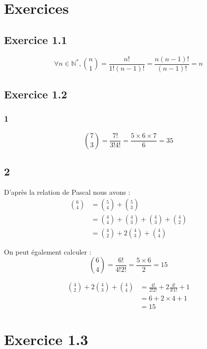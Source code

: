 \documentclass{report}
\begin{document}
\section*{Exercices}

\subsection*{Exercice 1.1}

\[ \forall n \in \mathbb{N}^*, \binom{n}{1} =\frac{n!}{1!(n-1)!} = \frac{n(n-1)!}{(n-1)!} = n\]

\subsection*{Exercice 1.2}

\subsubsection*{1}
\[ \binom{7}{3} = \frac{7!}{3!4!} = \frac{5 \times 6 \times 7}{6} = 35\]

\subsection*{2}

D'après la relation de Pascal nous avons :
\begin{equation*}
	\begin{split}
		\binom{6}{4} &= \binom{5}{4} + \binom{5}{3} \\
		             &= \binom{4}{4} + \binom{4}{3} + \binom{4}{3} + \binom{4}{2} \\
		             &= \binom{4}{2} + 2\binom{4}{3} + \binom{4}{4}
	\end{split}
\end{equation*}

On peut également calculer :
\[\binom{6}{4} = \frac{6!}{4!2!} = \frac{5 \times 6}{2} = 15\]

\begin{equation*}
	\begin{split}
		\binom{4}{2} + 2\binom{4}{3} + \binom{4}{4} &= \frac{4!}{2!2!} + 2\frac{4!}{3!1!} + 1 \\
		                                            &= 6 + 2 \times 4 + 1 \\
		                                            &= 15
	\end{split}
\end{equation*}


\section*{Exercice 1.3}
\end{document}
